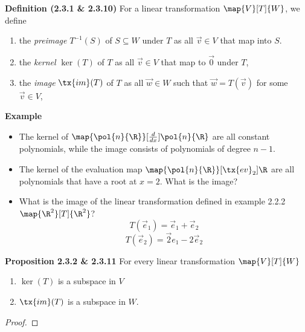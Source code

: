 \documentclass[letterpaper, 10pt]{article}
\begin{document}
\lb
\textbf{Definition (2.3.1 \& 2.3.10)}
\lb
For a linear transformation $ \map{V}[T]{W}$, we define
\begin{enumerate}
    \item
        the \emph{preimage} $T^{-1}(S)$ of $S \subseteq W$ under $T$ as all $\vec v ∈ V$ that map into $S$.
    \item
        the \emph{kernel} $\ker(T)$ of $T$  as all $\vec v ∈ V$ that map to $\vec 0$ under $T$,
    \item 
        the \emph{image} $\tx{im}(T)$ of $T$ as all $\vec w ∈ W$ such that $\vec w = T(\vec v)$ for some $\vec v ∈ V$,
\end{enumerate}




\vspace{100pt}
\lb
\textbf{Example}
\begin{itemize}
    \item
    The kernel of $\map{\pol{n}{\R}}[\frac{d}{dx}]{\pol{n}{\R}}$ are all constant polynomials,
    while the image consists of polynomials of degree $n-1$.

    \item
    The kernel of the evaluation map $\map{\pol{n}{\R}}[\tx{ev}_2]{\R}$ are all
    polynomials that have a root at $x = 2$. What is the image?

    \item
    What is the image of the linear transformation defined in example 2.2.2 $\map{\R^2}[T]{\R^2}$?
    \[ T(\vec e_1) = \vec e_1 + \vec e_2 \]
    \[ T(\vec e_2) = \vec 2 e_1 - 2 \vec e_2 \]
\end{itemize}


\newpage
\lb
\textbf{Proposition 2.3.2 \& 2.3.11}
\lb
For every linear transformation $\map{V}[T]{W}$
\begin{enumerate}
    \item $\ker(T)$ is a subspace in $V$
    \item $\tx{im}(T)$ is a subspace in $W$.
\end{enumerate}
\begin{proof}
\end{proof}
\end{document}
